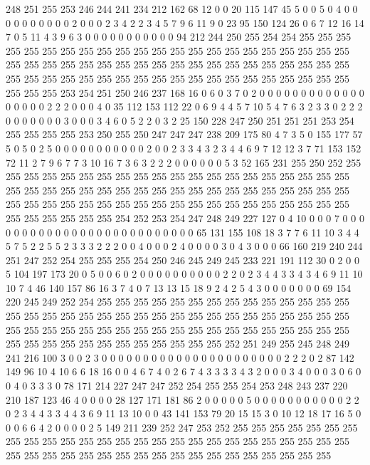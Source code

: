 248 251 255 253 246 244 241 234 212 162 68 12 0 0 20 115 147 45 5 0
0 5 0 4 0 0 0 0 0 0 0 0 0 0 2 0 0 0 2 3
4 2 2 3 4 5 7 9 6 11 9 0 23 95 150 124 26 0 6 7
12 16 14 7 0 5 11 4 3 9 6 3 0 0 0 0 0 0 0 0
0 0 0 94 212 244 250 255 254 254 255 255 255 255 255 255 255 255 255 255
255 255 255 255 255 255 255 255 255 255 255 255 255 255 255 255 255 255 255 255
255 255 255 255 255 255 255 255 255 255 255 255 255 255 255 255 255 255 255 255
255 255 255 255 255 255 255 255 255 255 255 255 255 253 254 251 250 246 237 168
16 0 6 0 3 7 0 2 0 0 0 0 0 0 0 0 0 0 0 0
0 0 0 0 0 0 2 2 2 0 0 0 4 0 35 112 153 112 22 0
6 9 4 4 5 7 10 5 4 7 6 3 2 3 3 0 2 2 2 0
0 0 0 0 0 0 3 0 0 0 3 4 6 0 5 2 2 0 3 2
25 150 228 247 250 251 251 251 253 254 255 255 255 255 253 250 255 250 247 247
247 238 209 175 80 4 7 3 5 0 155 177 57 5 0 5 0 2 5 0
0 0 0 0 0 0 0 0 0 0 2 0 0 2 3 3 4 3 2 3
4 4 6 9 7 12 12 3 7 71 153 152 72 11 2 7 9 6 7 7
3 10 16 7 3 6 3 2 2 2 0 0 0 0 0 0 5 3 52 165
231 255 250 252 255 255 255 255 255 255 255 255 255 255 255 255 255 255 255 255
255 255 255 255 255 255 255 255 255 255 255 255 255 255 255 255 255 255 255 255
255 255 255 255 255 255 255 255 255 255 255 255 255 255 255 255 255 255 255 255
255 255 255 255 255 255 255 255 254 252 253 254 247 248 249 227 127 0 4 10
0 0 0 7 0 0 0 0 0 0 0 0 0 0 0 0 0 0 0 0
0 0 0 0 0 0 0 0 0 0 65 131 155 108 18 3 7 7 6 11
10 3 4 4 5 7 5 2 2 5 5 2 3 3 3 2 2 2 0 0
4 0 0 0 2 4 0 0 0 0 3 0 4 3 0 0 0 66 160 219
240 244 251 247 252 254 255 255 255 254 250 246 245 249 245 233 221 191 112 30
0 2 0 0 5 104 197 173 20 0 5 0 0 6 0 2 0 0 0 0
0 0 0 0 0 0 2 2 0 2 3 4 4 3 3 4 3 4 6 9
11 10 10 7 4 46 140 157 86 16 3 7 4 0 7 13 13 15 18 9
2 4 2 5 4 3 0 0 0 0 0 0 0 69 154 220 245 249 252 254
255 255 255 255 255 255 255 255 255 255 255 255 255 255 255 255 255 255 255 255
255 255 255 255 255 255 255 255 255 255 255 255 255 255 255 255 255 255 255 255
255 255 255 255 255 255 255 255 255 255 255 255 255 255 255 255 255 255 255 255
255 255 255 255 252 251 249 255 245 248 249 241 216 100 3 0 0 2 3 0
0 0 0 0 0 0 0 0 0 0 0 0 0 0 0 0 0 0 0 0
0 2 2 2 0 2 87 142 149 96 10 4 10 6 6 18 16 0 0 4
6 7 4 0 2 6 7 4 3 3 3 3 4 3 2 0 0 0 3 4
0 0 0 3 0 6 0 0 4 0 3 3 3 0 78 171 214 227 247 247
252 254 255 255 254 253 248 243 237 220 210 187 123 46 4 0 0 0 0 28
127 171 181 86 2 0 0 0 0 0 5 0 0 0 0 0 0 0 0 0
0 0 2 2 0 2 3 4 4 3 3 4 4 3 6 9 11 13 10 0
0 43 141 153 79 20 15 15 3 0 10 12 18 17 16 5 0 0 0 6
6 4 2 0 0 0 0 2 5 149 211 239 252 247 253 252 255 255 255 255
255 255 255 255 255 255 255 255 255 255 255 255 255 255 255 255 255 255 255 255
255 255 255 255 255 255 255 255 255 255 255 255 255 255 255 255 255 255 255 255
